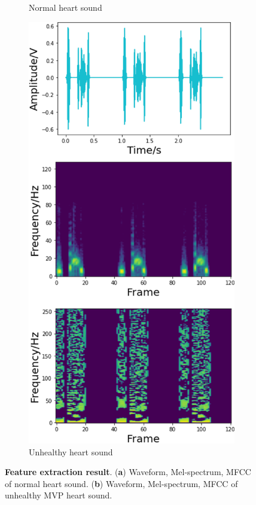 \begin{figure}[!h]
\begin{subfigure}{.48\linewidth}
        \caption{Normal heart sound}
        \label{FIG:mfcc.a}
    \end{subfigure}\hfill
    \begin{subfigure}{.48\linewidth}
        \centering
        \includegraphics[width=1\linewidth]{figs/results/mvp_mfcc.png}
        \caption{Unhealthy heart sound}
        \label{FIG:mfcc.b}
    \end{subfigure}
\caption{\textbf{Feature extraction result}. (\textbf{a}) Waveform, Mel-spectrum, MFCC of normal heart sound. (\textbf{b}) Waveform, Mel-spectrum, MFCC of unhealthy MVP heart sound.}
\label{FIG:mfcc}
\end{figure}
